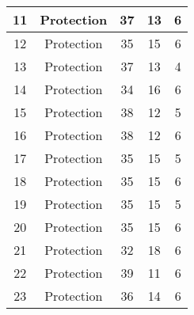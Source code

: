 \documentclass[results.tex]{subfiles}
\begin{document}
\begin{center}
\begin{tabular}{| c || c | c | c | c |}
            \hline
            11                      & Protection                   & 37                     & 13                      & 6                    \\
            \hline
            12                      & Protection                   & 35                     & 15                      & 6                    \\
            \hline
            13                      & Protection                   & 37                     & 13                      & 4                    \\
            \hline
            14                      & Protection                   & 34                     & 16                      & 6                    \\
            \hline
            15                      & Protection                   & 38                     & 12                      & 5                    \\
            \hline
            16                      & Protection                   & 38                     & 12                      & 6                    \\
            \hline
            17                      & Protection                   & 35                     & 15                      & 5                    \\
            \hline
            18                      & Protection                   & 35                     & 15                      & 6                    \\
            \hline
            19                      & Protection                   & 35                     & 15                      & 5                    \\
            \hline
            20                      & Protection                   & 35                     & 15                      & 6                    \\
            \hline
            21                      & Protection                   & 32                     & 18                      & 6                    \\
            \hline
            22                      & Protection                   & 39                     & 11                      & 6                    \\
            \hline
            23                      & Protection                   & 36                     & 14                      & 6                    \\

\end{tabular}
\end{center}
\end{document}
